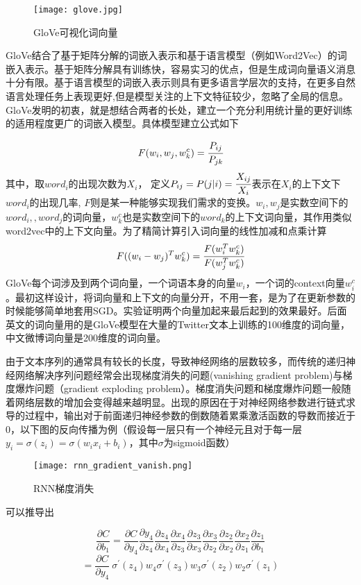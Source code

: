 \begin{figure}[htbp]
	\centering
	\texttt{[image: glove.jpg]}
	\caption[rnn_vanish]{GloVe可视化词向量}
\end{figure}

GloVe结合了基于矩阵分解的词嵌入表示和基于语言模型（例如Word2Vec）的词嵌入表示。基于矩阵分解具有训练快，容易实习的优点，但是生成词向量语义消息十分有限。基于语言模型的词嵌入表示则具有更多语言学层次的支持，在更多自然语言处理任务上表现更好,但是模型关注的上下文特征较少，忽略了全局的信息。GloVe发明的初衷，就是想结合两者的长处，建立一个充分利用统计量的更好训练的适用程度更广的词嵌入模型。具体模型建立公式如下

$$ F(w_i,w_j,w^c_k) = \cfrac{P_{ij}}{P_{jk}} $$
其中，取$word_i$的出现次数为$X_i$， 定义$P_{ij}=P(j|i)=\cfrac{X_{ij}}{X_{i}}$表示在$X_i$的上下文下$word_i$的出现几率, $F$则是某一种能够实现我们需求的变换。$w_i,w_j$是实数空间下的$word_i,,word_j$的词向量，$w^c_k$也是实数空间下的$word_k$的上下文词向量，其作用类似word2vec中的上下文向量。为了精简计算引入词向量的线性加减和点乘计算
$$ F((w_i-w_j)^Tw^c_k) = \cfrac{F(w^T_iw^c_k)}{{F(w^T_jw^c_k)}} $$
GloVe每个词涉及到两个词向量，一个词语本身的向量$w_i$，一个词的context向量$w^c_i$。最初这样设计，将词向量和上下文的向量分开，不用一套，是为了在更新参数的时候能够简单地套用SGD。实验证明两个向量加起来最后起到的效果最好。后面英文的词向量用的是GloVe模型在大量的Twitter文本上训练的100维度的词向量，中文微博词向量是200维度的词向量。

由于文本序列的通常具有较长的长度，导致神经网络的层数较多，而传统的递归神经网络解决序列问题经常会出现梯度消失的问题(vanishing gradient problem)与梯度爆炸问题（gradient exploding problem）。梯度消失问题和梯度爆炸问题一般随着网络层数的增加会变得越来越明显。出现的原因在于对神经网络参数进行链式求导的过程中，输出对于前面递归神经参数的倒数随着累乘激活函数的导数而接近于0，以下图的反向传播为例（假设每一层只有一个神经元且对于每一层$y_i=\sigma(z_i)=\sigma(w_ix_i+b_i)$，其中$\sigma$为sigmoid函数）

\begin{figure}[htbp]
	\centering
	\texttt{[image: rnn\_gradient\_vanish.png]}
	\caption[rnn_vanish]{RNN梯度消失}
\end{figure}

可以推导出

\begin{equation}\label{nodelimiter}
\frac{\partial C}{\partial b_1} = \frac{\partial C}{\partial y_4}\frac{\partial y_4}{\partial z_4}\frac{\partial z_4}{\partial x_4}\frac{\partial x_4}{\partial z_3}\frac{\partial z_3}{\partial x_3}\frac{\partial x_3}{\partial z_2}\frac{\partial z_2}{\partial x_2}\frac{\partial x_2}{\partial z_1}\frac{\partial z_1}{\partial b_1}
\end{equation}
\begin{equation}\label{delimiter}
=\frac{\partial C}{\partial y_4}\ \sigma ^\prime(z_4)w_4\sigma ^\prime(z_3)w_3\sigma ^\prime(z_2)w_2\sigma ^\prime(z_1)
\end{equation}

